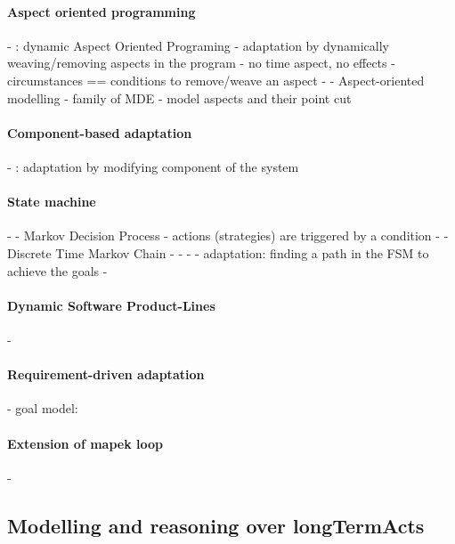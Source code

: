 \paragraph{Aspect oriented programming}
- \cite{DBLP:journals/taosd/GreenwoodB06, DBLP:conf/soco/DavidL06, DBLP:conf/icws/CharfiDM09, DBLP:journals/scp/ParraBCD11, DBLP:conf/ewsa/FalcarinA04, DBLP:conf/gpce/PintoFT03}: dynamic Aspect Oriented Programing
	- adaptation by dynamically weaving/removing aspects in the program
	- no time aspect, no effects
	- circumstances == conditions to remove/weave an aspect
- \cite{DBLP:conf/icse/MorinBNJ09}
	- Aspect-oriented modelling
	 - family of MDE
	- model aspects and their point cut

\paragraph{Component-based adaptation}
- \cite{DBLP:conf/soco/DavidL06}: adaptation by modifying component of the system

\paragraph{State machine}
- \cite{DBLP:conf/sigsoft/MorenoCGS15}
	- Markov Decision Process
	- actions (strategies) are triggered by a condition
- \cite{DBLP:conf/kbse/FilieriGLM11}
	- Discrete Time Markov Chain
- \cite{DBLP:conf/wetice/DjoudiBZ14}
- \cite{DBLP:conf/aosd/ZhangGC09}
- \cite{DBLP:conf/icse/GhezziPST13}
	- adaptation: finding a path in the FSM to achieve the goals
- \cite{DBLP:conf/kbse/TajalliGEM10}

\paragraph{Dynamic Software Product-Lines}
- \cite{DBLP:conf/dagstuhl/GhezziS10, DBLP:series/lncs/CordyCHLS13}

\paragraph{Requirement-driven adaptation}
- goal model: \cite{DBLP:conf/re/BaresiPS10}

\paragraph{Extension of \gls{mapek} loop}
- \cite{DBLP:conf/iscc/MaurerBEB11}

	


\subsection[Modelling and reasoning over long-term actions]{Modelling and reasoning over \glspl{longTermAct}}